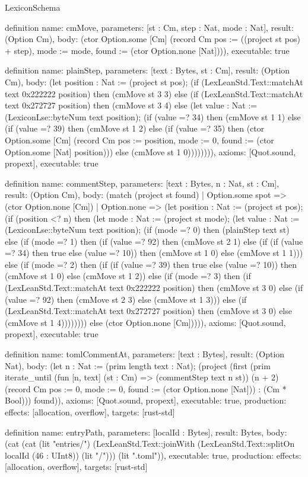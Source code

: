 \begin{lexlean}{LexiconSchema}
\begin{semanticmodule}
definition{
  name: cmMove,
  parameters: [st : Cm, step : Nat, mode : Nat],
  result: (Option Cm),
  body: (ctor Option.some [Cm] (record Cm {pos := ((project st pos) + step), mode := mode, found := (ctor Option.none [Nat])})),
  executable: true
}

definition{
  name: plainStep,
  parameters: [text : Bytes, st : Cm],
  result: (Option Cm),
  body: (let position : Nat := (project st pos); (if (LexLeanStd.Text::matchAt text 0x222222 position) then (cmMove st 3 3) else (if (LexLeanStd.Text::matchAt text 0x272727 position) then (cmMove st 3 4) else (let value : Nat := (LexiconLse::byteNum text position); (if (value =? 34) then (cmMove st 1 1) else (if (value =? 39) then (cmMove st 1 2) else (if (value =? 35) then (ctor Option.some [Cm] (record Cm {pos := position, mode := 0, found := (ctor Option.some [Nat] position)})) else (cmMove st 1 0)))))))),
  axioms: [Quot.sound, propext],
  executable: true
}

definition{
  name: commentStep,
  parameters: [text : Bytes, n : Nat, st : Cm],
  result: (Option Cm),
  body: (match (project st found)
    | Option.some spot => (ctor Option.none [Cm])
    | Option.none => (let position : Nat := (project st pos); (if (position <? n) then (let mode : Nat := (project st mode); (let value : Nat := (LexiconLse::byteNum text position); (if (mode =? 0) then (plainStep text st) else (if (mode =? 1) then (if (value =? 92) then (cmMove st 2 1) else (if (if (value =? 34) then true else (value =? 10)) then (cmMove st 1 0) else (cmMove st 1 1))) else (if (mode =? 2) then (if (if (value =? 39) then true else (value =? 10)) then (cmMove st 1 0) else (cmMove st 1 2)) else (if (mode =? 3) then (if (LexLeanStd.Text::matchAt text 0x222222 position) then (cmMove st 3 0) else (if (value =? 92) then (cmMove st 2 3) else (cmMove st 1 3))) else (if (LexLeanStd.Text::matchAt text 0x272727 position) then (cmMove st 3 0) else (cmMove st 1 4)))))))) else (ctor Option.none [Cm])))),
  axioms: [Quot.sound, propext],
  executable: true
}

definition{
  name: tomlCommentAt,
  parameters: [text : Bytes],
  result: (Option Nat),
  body: (let n : Nat := (prim length text : Nat); (project (first (prim iterate_until (fun [n, text] (st : Cm) => (commentStep text n st)) (n + 2) (record Cm {pos := 0, mode := 0, found := (ctor Option.none [Nat])}) : (Cm * Bool))) found)),
  axioms: [Quot.sound, propext],
  executable: true,
  production: {effects: [allocation, overflow], targets: [rust-std]}
}

definition{
  name: entryPath,
  parameters: [localId : Bytes],
  result: Bytes,
  body: (cat (cat (lit "entries/") (LexLeanStd.Text::joinWith (LexLeanStd.Text::splitOn localId (46 : UInt8)) (lit "/"))) (lit ".toml")),
  executable: true,
  production: {effects: [allocation, overflow], targets: [rust-std]}
}
\end{semanticmodule}
\end{lexlean}
